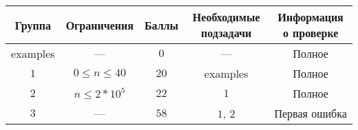 \documentclass{article}
\begin{document}
    \begin{center}
        \begin{tabular}{ | c | c | c | c | c | } \hline
            \bf{Группа} & \bf{Ограничения} & \bf{Баллы} & \bf{Необходимые подзадачи} & \bf{Информация о проверке} \\ \hline
            examples & --- & $0$ & --- & Полное \\ \hline
            $1$ & $0 \le n \le 40$ & $20$ & examples & Полное \\ \hline
            $2$ & $n \le 2*10^5$ & $22$ & $1$ & Полное \\ \hline
            $3$ &  ---  & $58$ & $1$, $2$ & Первая ошибка \\ \hline
        \end{tabular}
    \end{center}
\end{document}
